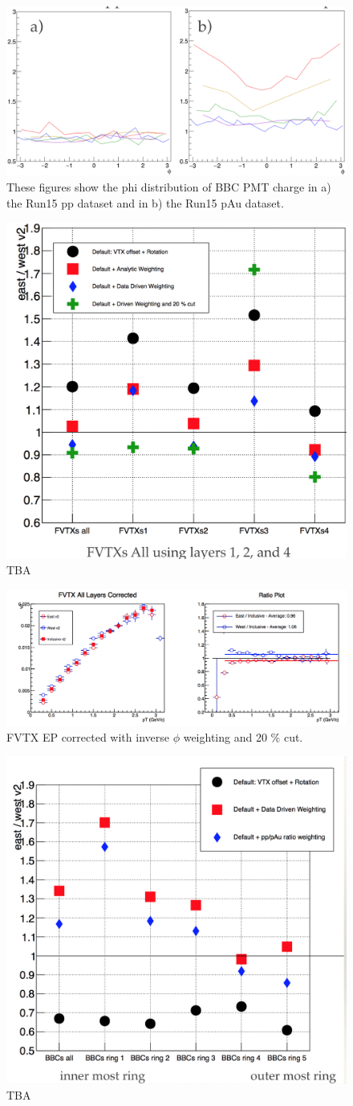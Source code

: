 \begin{figure}[!h]
\begin{center}
\includegraphics[width=0.6\linewidth]{figs/pp_pau_bbc_comparison.png}
\caption{These figures show the phi distribution of BBC PMT charge in a) the Run15 pp dataset and in b) the Run15 pAu dataset.}
\end{center}
\end{figure}
\begin{figure}[!h]
\begin{center}
\includegraphics[width=0.5\linewidth]{figs/fvtx_correction_summary.png}
\caption{TBA}
\end{center}
\end{figure}
\begin{figure}[!h]
\begin{center}
\includegraphics[width=0.5\linewidth]{figs/fvtx_corrected.png}
\caption{FVTX EP corrected with inverse $\phi$ weighting and 20 $\%$ cut.}
\end{center}
\end{figure}
\begin{figure}[!h]
\begin{center}
\includegraphics[width=0.5\linewidth]{figs/bbc_correction_summary.png}
\caption{TBA}
\end{center}
\end{figure}
